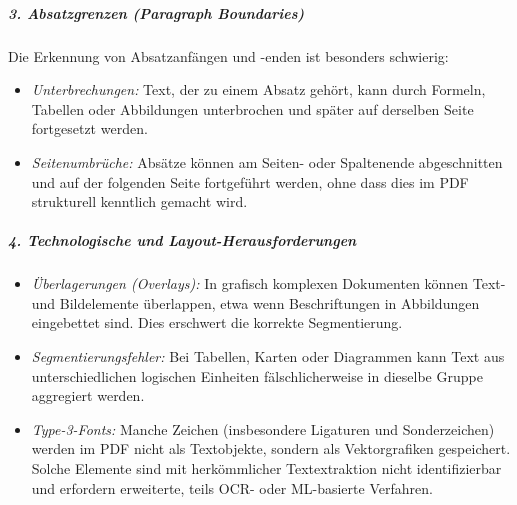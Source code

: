 \subparagraph{3. Absatzgrenzen (Paragraph Boundaries)}
Die Erkennung von Absatzanfängen und -enden ist besonders schwierig:
\begin{itemize}
    \item \emph{Unterbrechungen:} Text, der zu einem Absatz gehört, kann durch Formeln, Tabellen oder Abbildungen unterbrochen und später auf derselben Seite 
    fortgesetzt werden.
    \item \emph{Seitenumbrüche:} Absätze können am Seiten- oder Spaltenende abgeschnitten und auf der folgenden Seite fortgeführt werden, ohne dass dies
    im PDF strukturell kenntlich gemacht wird.
\end{itemize}
\cite{Bast2017}

\subparagraph{4. Technologische und Layout-Herausforderungen}
\begin{itemize}
    \item \emph{Überlagerungen (Overlays):} 
    In grafisch komplexen Dokumenten können Text- und Bildelemente überlappen, etwa wenn Beschriftungen in Abbildungen eingebettet sind. 
    Dies erschwert die korrekte Segmentierung. \cite{Chao2004}
    \item \emph{Segmentierungsfehler:} 
    Bei Tabellen, Karten oder Diagrammen kann Text aus unterschiedlichen logischen Einheiten fälschlicherweise in dieselbe Gruppe aggregiert werden. \cite{Chao2004}
    \item \emph{Type-3-Fonts:} 
    Manche Zeichen (insbesondere Ligaturen und Sonderzeichen) werden im PDF nicht als Textobjekte, sondern als Vektorgrafiken gespeichert. 
    Solche Elemente sind mit herkömmlicher Textextraktion nicht identifizierbar und erfordern erweiterte, teils OCR- oder ML-basierte Verfahren. \cite{Bast2017}
\end{itemize}


